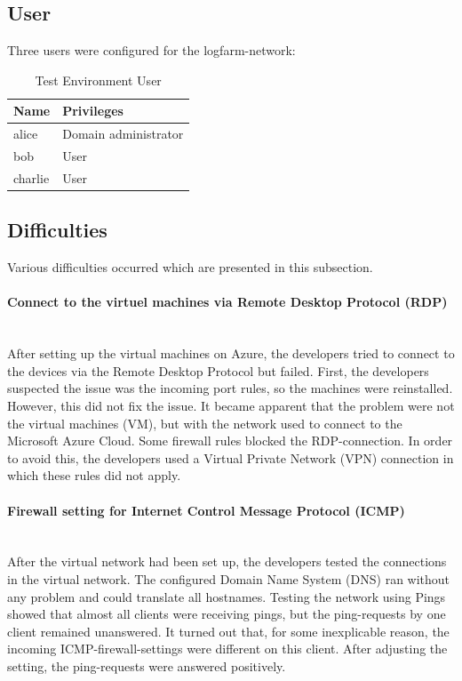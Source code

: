 \subsection{User}
Three users were configured for the logfarm-network:
\begin{table}[H]
    \centering
    \begin{tabular}{p{4cm} p{8cm}} \hline
        \textbf{Name} & \textbf{Privileges}  \\ \hline
        alice & Domain administrator  \\ \hline
        bob & User  \\ \hline
        charlie & User  \\ \hline
    \end{tabular}
    \caption{Test Environment User}
\end{table}

\subsection{Difficulties}
Various difficulties occurred which are presented in this subsection.
\paragraph{Connect to the virtuel machines via Remote Desktop Protocol (RDP)} \ \\
After setting up the virtual machines on Azure, the developers tried to connect to the devices via the Remote Desktop Protocol but failed. First, the developers suspected the issue was the incoming port rules, so the machines were reinstalled. However, this did not fix the issue. It became apparent that the problem were not the virtual machines (VM), but with the network used to connect to the Microsoft Azure Cloud. Some firewall rules blocked the RDP-connection. In order to avoid this, the developers used a Virtual Private Network (VPN) connection in which these rules did not apply.
\paragraph{Firewall setting for Internet Control Message Protocol (ICMP)}\ \\
After the virtual network had been set up, the developers tested the connections in the virtual network. The configured Domain Name System (DNS) ran without any problem and could translate all hostnames. Testing the network using Pings showed that almost all clients were receiving pings, but the ping-requests by one client remained unanswered. It turned out that, for some inexplicable reason, the incoming ICMP-firewall-settings were different on this client. After adjusting the setting, the ping-requests were answered positively.

